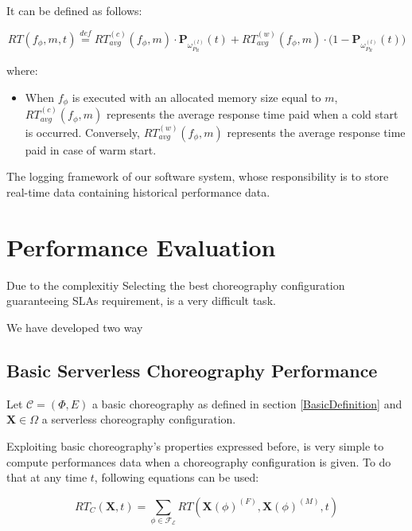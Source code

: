\documentclass[12pt,a4paper]{report}
\newcommand{\mathDef}{\overset{\textit{def}}{=}}
\theoremstyle{definition}
\begin{document}
\begin{itemize}
	It can be defined as follows:
	
	\begin{equation}
		RT(f_{\phi},m,t) \mathDef RT_{avg}^{(c)}(f_{\phi}, m) \cdot \textbf{P}_{\omega_{P_R}^{(l)}}(t) + RT_{avg}^{(w)}(f_{\phi}, m) \cdot \Big( 1 - \textbf{P}_{\omega_{P_R}^{(l)}}(t)  \Big)
	\end{equation}

	where:
	
	\begin{itemize}
		\item When $f_{\phi}$ is executed with an allocated memory size equal to $m$, 
		$RT_{avg}^{(c)}(f_{\phi}, m)$ represents the average response time paid when a cold start is occurred. Conversely, $RT_{avg}^{(w)}(f_{\phi}, m)$ represents the average response time paid in case of warm start.
	\end{itemize}


	
\end{itemize}




The logging framework of our software system, whose responsibility is to store
real-time data containing historical performance data.

\section{Performance Evaluation}

Due to the complexitiy Selecting the best choreography configuration guaranteeing SLAs requirement, is a very difficult task.

We have developed two way 


\subsection{Basic Serverless Choreography Performance}

Let $\mathcal{C} = (\Phi,E)$ a basic choreography as defined in section \ref{BasicDefinition} and $\textbf{X} \in \Omega$ a serverless choreography configuration.

Exploiting basic choreography's properties expressed before, is very simple to compute performances data when a choreography configuration is given. To do that at any time $t$, following equations can be used:

\begin{equation}\label{eq:perfF1}
	RT_C(\textbf{X}, t) = \sum_{\phi \in \mathscr{F_E}} RT(\textbf{X}(\phi)^{(F)},\textbf{X}(\phi)^{(M)},t)
\end{equation}
\end{document}
